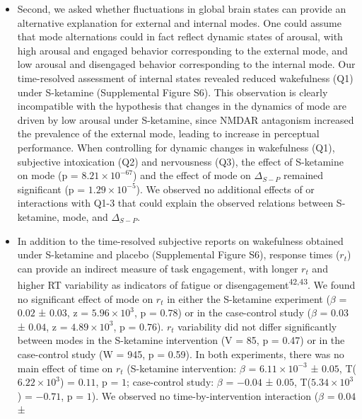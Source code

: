 \documentclass[
]{article}
\begin{document}
\begin{itemize}
\item
  Second, we asked whether fluctuations in global brain states can
  provide an alternative explanation for external and internal modes.
  One could assume that mode alternations could in fact reflect dynamic
  states of arousal, with high arousal and engaged behavior
  corresponding to the external mode, and low arousal and disengaged
  behavior corresponding to the internal mode. Our time-resolved
  assessment of internal states revealed reduced wakefulness (Q1) under
  S-ketamine (Supplemental Figure S6). This observation is clearly
  incompatible with the hypothesis that changes in the dynamics of mode
  are driven by low arousal under S-ketamine, since NMDAR antagonism
  increased the prevalence of the external mode, leading to increase in
  perceptual performance. When controlling for dynamic changes in
  wakefulness (Q1), subjective intoxication (Q2) and nervousness (Q3),
  the effect of S-ketamine on mode (p =
  \(\ensuremath{8.21\times 10^{-67}}\)) and the effect of mode on
  \(\Delta_{S-P}\) remained significant (p =
  \(\ensuremath{1.29\times 10^{-5}}\)). We observed no additional
  effects of or interactions with Q1-3 that could explain the observed
  relations between S-ketamine, mode, and \(\Delta_{S-P}\).
\item
  In addition to the time-resolved subjective reports on wakefulness
  obtained under S-ketamine and placebo (Supplemental Figure S6),
  response times (\(r_t\)) can provide an indirect measure of task
  engagement, with longer \(r_t\) and higher RT variability as
  indicators of fatigue or disengagement\textsuperscript{42,43}. We
  found no significant effect of mode on \(r_t\) in either the
  S-ketamine experiment (\(\beta\) = \(0.02\) ± \(0.03\), z =
  \(\ensuremath{5.96\times 10^{3}}\), p = \(0.78\)) or in the
  case-control study (\(\beta\) = \(0.03\) ± \(0.04\), z =
  \(\ensuremath{4.89\times 10^{3}}\), p = \(0.76\)). \(r_t\) variability
  did not differ significantly between modes in the S-ketamine
  intervention (V = 85, p = 0.47) or in the case-control study (W = 945,
  p = 0.59). In both experiments, there was no main effect of time on
  \(r_t\) (S-ketamine intervention: \(\beta\) =
  \(\ensuremath{6.11\times 10^{-3}}\) ± \(0.05\),
  T(\(\ensuremath{6.22\times 10^{3}}\)) = \(0.11\), p = \(1\);
  case-control study: \(\beta\) = \(-0.04\) ± \(0.05\),
  T(\(\ensuremath{5.34\times 10^{3}}\)) = \(-0.71\), p = \(1\)). We
  observed no time-by-intervention interaction (\(\beta\) = \(0.04\) ±

\end{itemize}
\end{document}
